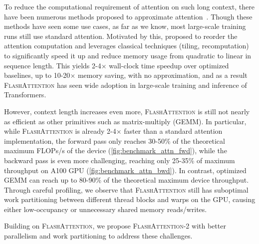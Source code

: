 To reduce the computational requirement of attention on such long context, there have been numerous methods proposed to approximate
attention~\citep{kitaev2020reformer, roy2021efficient, wang2020linformer, katharopoulos2020transformers, choromanski2020rethinking, beltagy2020longformer, zaheer2020bigbird, scatterbrain}. Though these methods have seen some use cases, as far as we know, most large-scale training runs still use standard attention. Motivated by this, \citet{dao2022flashattention} proposed to reorder the attention computation and leverages classical techniques (tiling, recomputation) to significantly speed it up and reduce memory usage from quadratic to linear in sequence length. This yields 2-4$\times$ wall-clock time speedup over optimized baselines, up to
10-20$\times$ memory saving, with no approximation, and as a result \textsc{FlashAttention} has seen wide adoption in large-scale training and inference of Transformers.

However, context length increases even more, \textsc{FlashAttention} is still not nearly as efficient as other primitives such as matrix-multiply (GEMM). In particular, while \textsc{FlashAttention} is already 2-4$\times$ faster than a standard attention implementation, the forward pass only reaches 30-50\% of the theoretical maximum FLOPs/s of the device (\ref{fig:benchmark_attn_fwd}), while the backward pass is even more challenging, reaching only 25-35\% of maximum throughput on A100 GPU (\ref{fig:benchmark_attn_bwd}).
In contrast, optimized GEMM can reach up to 80-90\% of the theoretical maximum device throughput. Through careful profiling, we observe that \textsc{FlashAttention} still has suboptimal work partitioning between different thread blocks and warps on the GPU, causing either low-occupancy or unnecessary shared memory reads/writes.

Building on \textsc{FlashAttention}, we propose \textsc{FlashAttention-2} with better parallelism and work partitioning to address these challenges.

